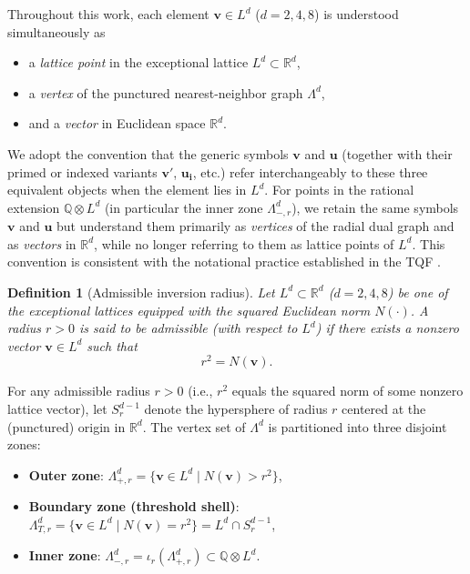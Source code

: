 \documentclass{article}
\newtheorem{definition}{Definition}
\begin{document}
Throughout this work, each element $\mathbf{v} \in L^d$ ($d=2,4,8$) is understood simultaneously as
\begin{itemize}
  \item a \emph{lattice point} in the exceptional lattice $L^d \subset \mathbb{R}^d$,
  \item a \emph{vertex} of the punctured nearest-neighbor graph $\Lambda^d$,
  \item and a \emph{vector} in Euclidean space $\mathbb{R}^d$.
\end{itemize}
We adopt the convention that the generic symbols $\mathbf{v}$ and $\mathbf{u}$ (together with their primed or indexed variants $\mathbf{v}'$, $\mathbf{u_i}$, etc.) refer interchangeably to these three equivalent objects when the element lies in $L^d$. For points in the rational extension $\mathbb{Q} \otimes L^d$ (in particular the inner zone $\Lambda_{-,r}^d$), we retain the same symbols $\mathbf{v}$ and $\mathbf{u}$ but understand them primarily as \emph{vertices} of the radial dual graph and as \emph{vectors} in $\mathbb{R}^d$, while no longer referring to them as lattice points of $L^d$. This convention is consistent with the notational practice established in the TQF \cite{Schmidt2025}.

\begin{definition}[Admissible inversion radius]
\label{def:admissible-inversion-radius}
Let $L^d \subset \mathbb{R}^d$ ($d=2,4,8$) be one of the exceptional lattices equipped with the squared Euclidean norm $N(\cdot)$. A radius $r > 0$ is said to be \emph{admissible} (with respect to $L^d$) if there exists a nonzero vector $\mathbf{v} \in L^d$ such that
\[
r^2 = N(\mathbf{v}).
\]
\end{definition}

For any admissible radius $r > 0$ (i.e., $r^2$ equals the squared norm of some nonzero lattice vector), let $S_r^{d-1}$ denote the hypersphere of radius $r$ centered at the (punctured) origin in $\mathbb{R}^d$. The vertex set of $\Lambda^d$ is partitioned into three disjoint zones:
\begin{itemize}
  \item \textbf{Outer zone}: $\Lambda_{+,r}^d = \{\mathbf{v} \in L^d \mid N(\mathbf{v}) > r^2\}$,
  \item \textbf{Boundary zone (threshold shell)}: $\Lambda_{T,r}^d = \{\mathbf{v} \in L^d \mid N(\mathbf{v}) = r^2\} = L^d \cap S_r^{d-1}$,
  \item \textbf{Inner zone}: $\Lambda_{-,r}^d = \iota_r(\Lambda_{+,r}^d) \subset \mathbb{Q} \otimes L^d$.
\end{itemize}
\end{document}
